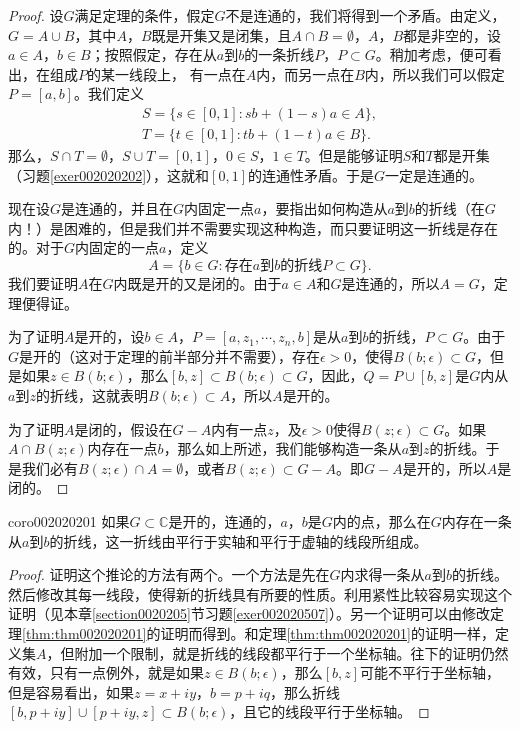 \begin{proof}
设$G$满足定理的条件，假定$G$不是连通的，我们将得到一个矛盾。由定义，$G = A \cup B$，其中$A$，$B$既是开集又是闭集，且$A \cap B = \emptyset$，$A$，$B$都是非空的，设$a \in A$，$b \in B$；按照假定，存在从$a$到$b$的一条折线$P$，$P \subset G$。稍加考虑，便可看出，在组成$P$的某一线段上， 有一点在$A$内，而另一点在$B$内，所以我们可以假定$P=[a, b]$。我们定义
\begin{gather*}
S = \{s \in [0, 1] : sb + (1-s)a \in A\},\\
T = \{t \in [0, 1] : tb + (1-t)a \in B\}.
\end{gather*}
那么，$S \cap T = \emptyset$，$S \cup T = [0,1]$，$0 \in S$，$1 \in T$。但是能够证明$S$和$T$都是开集（习题\ref{exer002020202}），这就和$[0,1]$的连通性矛盾。于是$G$一定是连通的。

现在设$G$是连通的，并且在$G$内固定一点$a$，要指出如何构造从$a$到$b$的折线（在$G$内！）是困难的，但是我们并不需要实现这种构造，而只要证明这一折线是存在的。对于$G$内固定的一点$a$，定义
\[
A = \{ b \in G: \text{存在}a\text{到}b\text{的折线}P \subset G\}.
\]
我们要证明$A$在$G$内既是开的又是闭的。由于$a \in A$和$G$是连通的，所以$A = G$，定理便得证。

为了证明$A$是开的，设$b \in A$，$P = [a, z_1, \cdots, z_n, b]$是从$a$到$b$的折线，$P \subset G$。由于$G$是开的（这对于定理的前半部分并不需要），存在$\epsilon > 0$，使得$B(b; \epsilon) \subset G$，但是如果$z \in B(b; \epsilon)$，那么$[b, z] \subset B(b;\epsilon) \subset G$，因此，$Q = P \cup [b,z]$是$G$内从$a$到$z$的折线，这就表明$B(b; \epsilon) \subset A$，所以$A$是开的。

为了证明$A$是闭的，假设在$G-A$内有一点$z$，及$\epsilon > 0$使得$B(z; \epsilon) \subset G$。如果$A \cap B(z; \epsilon)$内存在一点$b$，那么如上所述，我们能够构造一条从$a$到$z$的折线。于是我们必有$B(z;\epsilon) \cap A = \emptyset$，或者$B(z;\epsilon) \subset G-A$。即$G-A$是开的，所以$A$是闭的。
\end{proof}

\begin{corollary}{}{coro002020201}
如果$G\subset{}\mathbb{C}$是开的，连通的，$a$，$b$是$G$内的点，那么在$G$内存在一条从$a$到$b$的折线，这一折线由平行于实轴和平行于虚轴的线段所组成。
\end{corollary}

\begin{proof}
证明这个推论的方法有两个。一个方法是先在$G$内求得一条从$a$到$b$的折线。然后修改其每一线段，使得新的折线具有所要的性质。利用紧性比较容易实现这个证明（见本章\ref{section0020205}节习题\ref{exer002020507}）。另一个证明可以由修改定理\ref{thm:thm002020201}的证明而得到。和定理\ref{thm:thm002020201}的证明一样，定义集$A$，但附加一个限制，就是折线的线段都平行于一个坐标轴。往下的证明仍然有效，只有一点例外，就是如果$z \in B(b; \epsilon)$，那么$[b,z]$可能不平行于坐标轴，但是容易看出，如果$z=x+iy$，$b=p+iq$，那么折线$[b,p+iy]\cup [p+iy, z] \subset B(b;\epsilon)$，且它的线段平行于坐标轴。
\end{proof}

